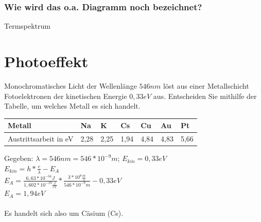\documentclass[12pt, a4paper]{article}
\begin{document}
\subsubsection{Wie wird das o.a. Diagramm noch bezeichnet?}
Termspektrum

\newpage

\section{Photoeffekt}
Monochromatisches Licht der Wellenlänge $546nm$ löst aus einer Metallschicht Fotoelektronen der kinetischen Energie $0,33eV$ aus.
Entscheiden Sie mithilfe der Tabelle, um welches Metall es sich handelt.

\begin{table}[htb]
	\begin{tabular}{|l|l|l|l|l|l|l|}
	\hline
	Metall                & Na   & K    & Cs   & Cu   & Au   & Pt   \\ \hline
	Austrittsarbeit in eV & 2,28 & 2,25 & 1,94 & 4,84 & 4,83 & 5,66 \\ \hline
	\end{tabular}
\end{table}

Gegeben: $\lambda=546nm=546*10^{-9}m$; $E_{kin}=0,33eV$\\
$E_{kin}=h*\frac{c}{\lambda}-E_A$\\
$E_A=\frac{6,63*10^{-34}J}{1,602*10^{-19}\frac{J}{eV}}*\frac{3*10^8\frac{m}{s}}{546*10^{-9}m}-0,33eV$\\
$E_A=1,94eV$\\\\
Es handelt sich also um Cäsium (Cs).
\end{document}
